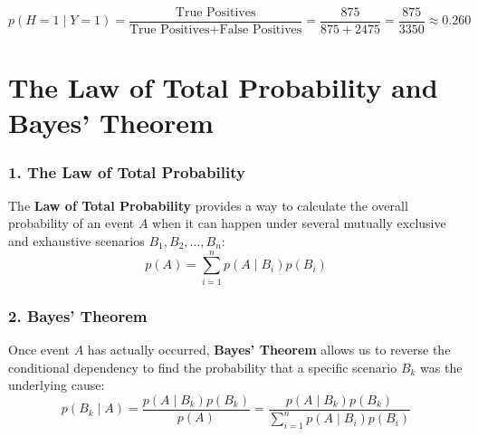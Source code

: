 \documentclass{article}
\begin{document}
\begin{center}
\end{center}

\begin{equation}
    p(H=1 \mid Y=1) = \frac{\text{True Positives}}{\text{True Positives} + \text{False Positives}} = \frac{875}{875 + 2475} = \frac{875}{3350} \approx 0.260
\end{equation}

\section*{The Law of Total Probability and Bayes' Theorem}

\subsubsection*{1. The Law of Total Probability}
The \textbf{Law of Total Probability} provides a way to calculate the overall probability of an event $A$ when it can happen under several mutually exclusive and exhaustive scenarios $B_1, B_2, \dots, B_n$:
\begin{equation}
    p(A) = \sum_{i=1}^{n} p(A \mid B_i) p(B_i)
\end{equation}

\subsubsection*{2. Bayes' Theorem}
Once event $A$ has actually occurred, \textbf{Bayes' Theorem} allows us to reverse the conditional dependency to find the probability that a specific scenario $B_k$ was the underlying cause:
\begin{equation}
    p(B_k \mid A) = \frac{p(A \mid B_k) p(B_k)}{p(A)} = \frac{p(A \mid B_k) p(B_k)}{\sum_{i=1}^{n} p(A \mid B_i) p(B_i)}
\end{equation}
\end{document}
